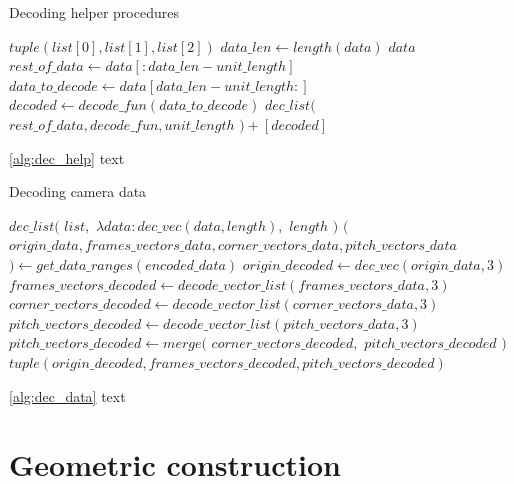 \documentclass[
    11pt,
    twoside
]{report}
\begin{document}
\begin{algorithm}[H]
\begin{algorithmic}
\caption{Decoding helper procedures}\label{alg:dec_help}
    \Return $tuple(list[0], list[1], list[2])$
\EndProcedure
{}
    \State
    $data\_len \gets length(data)$
        \Return $data$
    \EndIf
    \State $rest\_of\_data \gets data[:data\_len - unit\_length]$
    \State $data\_to\_decode \gets data[data\_len - unit\_length:]$
    \State $decoded \gets decode\_fun(data\_to\_decode)$
    \State
    \Return $dec\_list($
            \State \indent $rest\_of\_data,decode\_fun,unit\_length$
    \State $) + [decoded]$
\EndProcedure
\end{algorithmic}
\end{algorithm}


\ref{alg:dec_help} text


\begin{algorithm}[H]
\begin{algorithmic}
\caption{Decoding camera data}\label{alg:dec_data}
    \Return $dec\_list($
        \State \indent $list,$
        \State \indent $\lambda data: dec\_vec(data, length),$
        \State \indent $length$
    \State $)$
\EndProcedure
{}
    \State $($
    \State \indent $origin\_data, frames\_vectors\_data, corner\_vectors\_data, pitch\_vectors\_data$
    \State $) \gets get\_data\_ranges(encoded\_data)$
    \State $origin\_decoded \gets dec\_vec(origin\_data, 3)$
    \State $frames\_vectors\_decoded \gets decode\_vector\_list(frames\_vectors\_data, 3)$
    \State $corner\_vectors\_decoded \gets decode\_vector\_list(corner\_vectors\_data, 3)$
    \State $pitch\_vectors\_decoded \gets decode\_vector\_list(pitch\_vectors\_data, 3)$
    \State $pitch\_vectors\_decoded \gets merge($
        \State \indent $corner\_vectors\_decoded,$
        \State \indent $pitch\_vectors\_decoded$
    \State $)$
    \State
    \Return $tuple(origin\_decoded, frames\_vectors\_decoded, pitch\_vectors\_decoded)$
\EndProcedure
\end{algorithmic}
\end{algorithm}


\ref{alg:dec_data} text


\section{Geometric construction}
\end{document}

